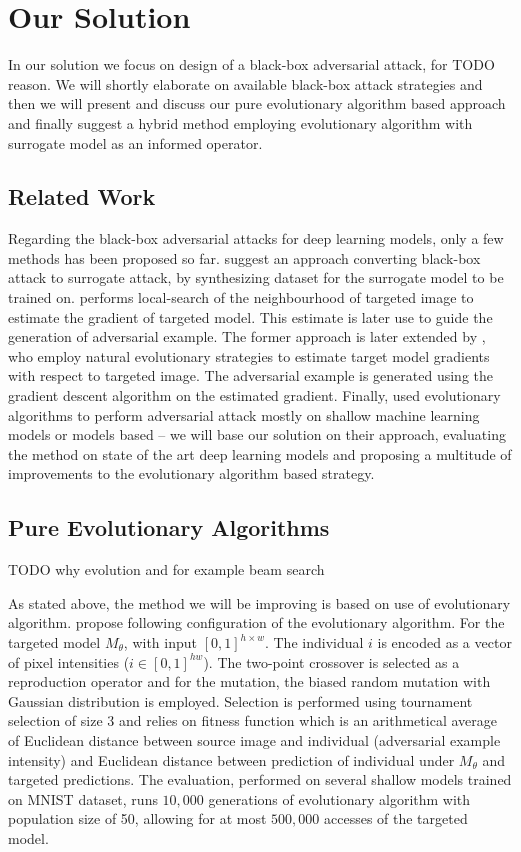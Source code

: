 \chapter{Our Solution}
In our solution we focus on design of a black-box adversarial attack, for TODO reason. We will shortly elaborate on available black-box attack strategies and then we will present and discuss our pure evolutionary algorithm based approach and finally suggest a hybrid method employing evolutionary algorithm with surrogate model as an informed operator.

\section{Related Work}
Regarding the black-box adversarial attacks for deep learning models, only a few methods has been proposed so far. \cite{DBLP:journals/corr/PapernotMGJCS16} suggest an approach converting black-box attack to surrogate attack, by synthesizing dataset for the surrogate model to be trained on. \cite{8014906} performs local-search of the neighbourhood of targeted image to estimate the gradient of targeted model. This estimate is later use to guide the generation of adversarial example. The former approach is later extended by \cite{DBLP:journals/corr/abs-1804-08598}, who employ natural evolutionary strategies to estimate target model gradients with respect to targeted image. The adversarial example is generated using the gradient descent algorithm on the estimated gradient. Finally, \cite{Vidnerova:2016:EGA:2955129.2955178} used evolutionary algorithms to perform adversarial attack mostly on shallow machine learning models or models based -- we will base our solution on their approach, evaluating the method on state of the art deep learning models and proposing a multitude of improvements to the evolutionary algorithm based strategy.

\section{Pure Evolutionary Algorithms}
TODO why evolution and for example beam search

As stated above, the method we will be improving is based on use of evolutionary algorithm. \cite{Vidnerova:2016:EGA:2955129.2955178} propose following configuration of the evolutionary algorithm. For the targeted model $M_\theta$, with input $[0,1]^{h \times w}$. The individual $i$ is encoded as a vector of pixel intensities ($i \in [0, 1]^{h w}$). The two-point crossover is selected as a reproduction operator and for the mutation, the biased random mutation with Gaussian distribution is employed. Selection is performed using tournament selection of size 3 and relies on fitness function which is an arithmetical average of Euclidean distance between source image and individual (adversarial example intensity) and Euclidean distance between prediction of individual under $M_\theta$ and targeted predictions. The evaluation, performed on several shallow models trained on MNIST dataset, runs $10,000$ generations of evolutionary algorithm with population size of 50, allowing for at most $500,000$ accesses of the targeted model.

